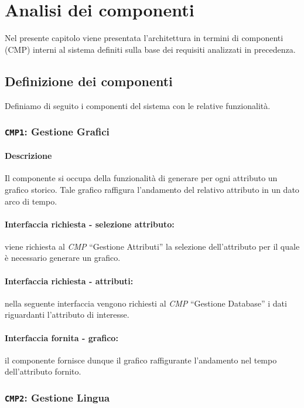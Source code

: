 \chapter{Analisi dei componenti}
    Nel presente capitolo viene presentata l'architettura in termini di componenti (CMP) interni al sistema definiti sulla base dei requisiti analizzati in precedenza.

\section{Definizione dei componenti}
    Definiamo di seguito i componenti del sistema con le relative funzionalità.
    
    \subsection{\texttt{CMP1}: Gestione Grafici}
        \subsubsection{Descrizione} 
            Il componente si occupa della funzionalità di generare per ogni attributo un grafico storico. Tale grafico raffigura l'andamento del relativo attributo in un dato arco di tempo.
        \subsubsection{Interfaccia richiesta - selezione attributo:}
            viene richiesta al \textit{CMP} ``Gestione Attributi'' la selezione dell'attributo per il quale è necessario generare un grafico.
        \subsubsection{Interfaccia richiesta - attributi:}
            nella seguente interfaccia vengono richiesti al \textit{CMP} ``Gestione Database'' i dati riguardanti l'attributo di interesse.
        \subsubsection{Interfaccia fornita - grafico:}
            il componente fornisce dunque il grafico raffigurante l'andamento nel tempo dell'attributo fornito.
    
    \subsection{\texttt{CMP2}: Gestione Lingua}
